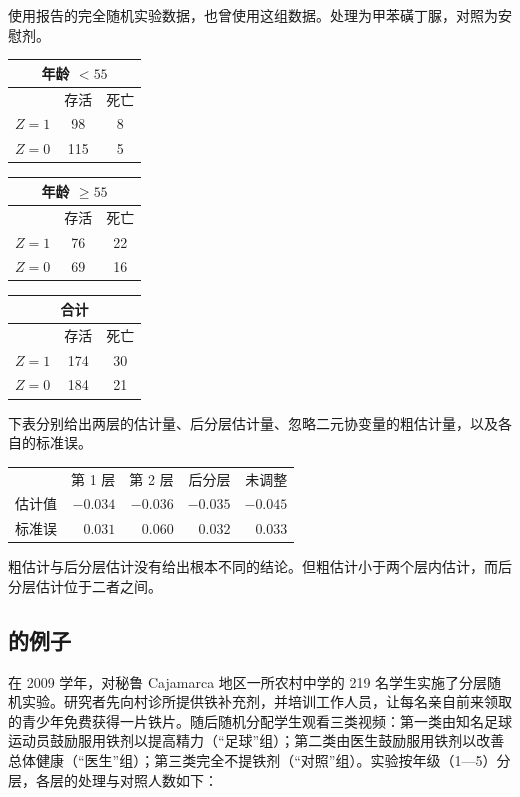 使用\citet{meinert1970study}报告的完全随机实验数据，\citet{rothman2008modern}也曾使用这组数据。处理为甲苯磺丁脲，对照为安慰剂。 
\begin{center} 
\begin{tabular}{ccc}
\multicolumn{3}{c}{ 年龄 $< 55$} \\
\hline 
 & 存活 & 死亡 \\
$Z=1$ &    98 & 8 \\
$Z=0$  & 115 & 5 \\
\hline 
\end{tabular}
\begin{tabular}{ccc}
\multicolumn{3}{c}{ 年龄 $\geq  55$} \\
\hline 
 & 存活 & 死亡 \\
$Z=1$ &    76 & 22 \\
$Z=0$  &  69 & 16 \\
\hline 
\end{tabular}
\begin{tabular}{ccc}
\multicolumn{3}{c}{合计 } \\
\hline 
 & 存活 & 死亡 \\
$Z=1$ &    174 & 30 \\
$Z=0$  & 184 & 21 \\
\hline 
\end{tabular}
\end{center}
 

下表分别给出两层的估计量、后分层估计量、忽略二元协变量的粗估计量，以及各自的标准误。  
\begin{center}
\begin{tabular}{crrrr}
\hline 
    &第 1 层& 第 2 层 &后分层 &  未调整 \\
估计值 &    $-0.034$ &   $-0.036$ &  $-0.035$ & $-0.045$ \\
标准误   &   $0.031$    & $0.060$   & $0.032$   & $0.033$\\
\hline 
\end{tabular}
\end{center} 


粗估计与后分层估计没有给出根本不同的结论。但粗估计小于两个层内估计，而后分层估计位于二者之间。


\subsection{\citet{chong2016iron}的例子}\label{sec::ps-chong}


\citet{chong2016iron}在 2009 学年，对秘鲁 Cajamarca 地区一所农村中学的 219 名学生实施了分层随机实验。研究者先向村诊所提供铁补充剂，并培训工作人员，让每名亲自前来领取的青少年免费获得一片铁片。随后随机分配学生观看三类视频：第一类由知名足球运动员鼓励服用铁剂以提高精力（“足球”组）；第二类由医生鼓励服用铁剂以改善总体健康（“医生”组）；第三类完全不提铁剂（“对照”组）。实验按年级（1—5）分层，各层的处理与对照人数如下：

